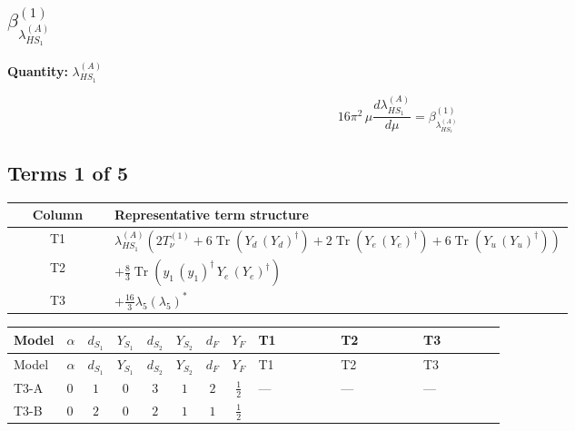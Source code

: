 \documentclass[8pt]{article}
\begin{document}
\begin{landscape}
\section*{$\beta_{\lambda_{HS_1}^{(A)}}^{(1)}$}
\noindent\textbf{Quantity: }$\lambda_{HS_1}^{(A)}$\par\smallskip
\[16\pi^2\,\mu\frac{d \lambda_{HS_1}^{(A)}}{d\mu}=\beta_{\lambda_{HS_1}^{(A)}}^{(1)}\]
\subsection*{Terms 1 of 5}
\begin{center}
\begin{tabular}{@{}c >{\raggedright\arraybackslash}p{0.82\linewidth}@{}}
\toprule
Column & Representative term structure \\
\midrule
T1 & \(\displaystyle {\lambda_{HS_1}^{(A)}} (2 T_{\nu}^{(1)}+6 \operatorname{Tr}\!\left({Y_d}\,\left({Y_d}\right)^{\dagger}\right)+2 \operatorname{Tr}\!\left({Y_e}\,\left({Y_e}\right)^{\dagger}\right)+6 \operatorname{Tr}\!\left({Y_u}\,\left({Y_u}\right)^{\dagger}\right))\) \\
\midrule
T2 & \(\displaystyle +\frac{8}{3} \operatorname{Tr}\!\left({y_1}\,\left({y_1}\right)^{\dagger}\,{Y_e}\,\left({Y_e}\right)^{\dagger}\right)\) \\
\midrule
T3 & \(\displaystyle +\frac{16}{3} {\lambda_5} \left({\lambda_5}\right)^{*}\) \\
\midrule
\bottomrule
\end{tabular}
\end{center}
\smallskip
\tiny
\begin{longtable}{@{}llcccccc >{\raggedright\arraybackslash}p{0.21\linewidth} >{\raggedright\arraybackslash}p{0.21\linewidth} >{\raggedright\arraybackslash}p{0.21\linewidth}@{}}
\toprule
Model & $\alpha$ & $d_{S_1}$ & $Y_{S_1}$ & $d_{S_2}$ & $Y_{S_2}$ & $d_F$ & $Y_F$ & T1 & T2 & T3 \\
\midrule
\endfirsthead
\toprule
Model & $\alpha$ & $d_{S_1}$ & $Y_{S_1}$ & $d_{S_2}$ & $Y_{S_2}$ & $d_F$ & $Y_F$ & T1 & T2 & T3 \\
\midrule
\endhead
T3-A & $0$ & $1$ & $0$ & $3$ & $1$ & $2$ & $\frac{1}{2}$ & --- & --- & --- \\
\midrule
T3-B & $0$ & $2$ & $0$ & $2$ & $1$ & $1$ & $\frac{1}{2}$ & \scriptsize\adjustbox{max width=\linewidth}{$\begin{gathered} {\lambda_{HS_1}^{(A)}} (2 T_{\nu}^{(1)}+6 \operatorname{Tr}\!\left({Y_d}\,\left({Y_d}\right)^{\dagger}\right)+2 \operatorname{Tr}\!\left({Y_e}\,\left({Y_e}\right)^{\dagger}\right)+6 \operatorname{Tr}\!\left({Y_u}\,\left({Y_u}\right)^{\dagger}\right))\end{gathered}$} & \scriptsize\adjustbox{max width=\linewidth}{$\begin{gathered} +\frac{8}{3} \operatorname{Tr}\!\left({y_1}\,\left({y_1}\right)^{\dagger}\,{Y_e}\,\left({Y_e}\right)^{\dagger}\right)\end{gathered}$} & \scriptsize\adjustbox{max width=\linewidth}{$\begin{gathered} +\frac{16}{3} {\lambda_5} \left({\lambda_5}\right)^{*}\end{gathered}$} \\

\end{longtable}
\end{landscape}
\end{document}
